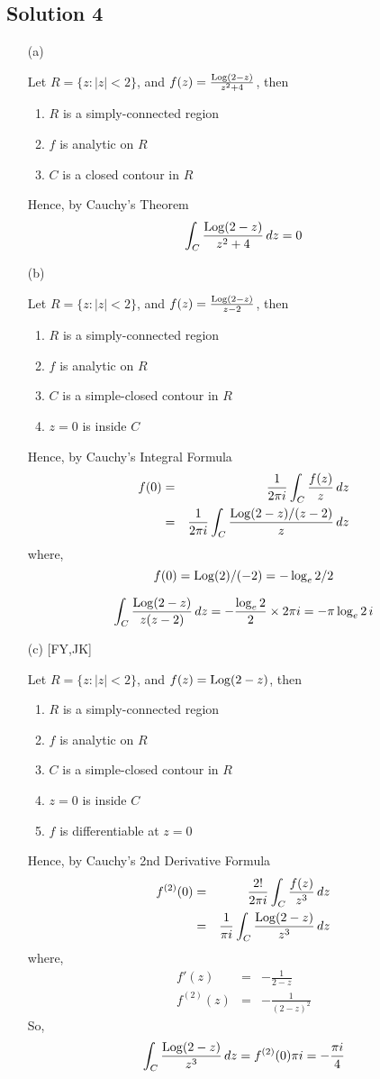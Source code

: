 \subsection*{Solution 4}

\begin{itemize}
\item[(a)]

Let $R=\{ z: |z|<2 \}$, and $f(z)=\frac{{\rm Log}(2-z)}{z^2+4}$, then
\begin{enumerate}
\item $R$ is a simply-connected region
\item $f$ is analytic on $R$
\item $C$ is a closed contour in $R$
\end{enumerate}
Hence, by Cauchy's Theorem
\[
\int_C \frac{{\rm Log}(2-z)}{z^2+4}\,dz = 0
\]

\item[(b)]

Let $R=\{ z: |z|<2 \}$, and $f(z)=\frac{{\rm Log}(2-z)}{z-2}$, then
\begin{enumerate}
\item $R$ is a simply-connected region
\item $f$ is analytic on $R$
\item $C$ is a simple-closed contour in $R$
\item $z=0$ is inside $C$
\end{enumerate}
Hence, by Cauchy's Integral Formula 
\begin{eqnarray*}
f(0)	&=& \frac{1}{2\pi i} \int_C \frac{f(z)}{z}\, dz \\
	&=& \frac{1}{2\pi i} \int_C \frac{{\rm Log}(2-z)/(z-2)}{z}\, dz \\
\end{eqnarray*}
where,
\[ f(0) = {\rm Log}(2)/(-2) = -\log_e 2/2 \]

\[
\int_C \frac{{\rm Log}(2-z)}{z(z-2)}\,dz = -\frac{\log_e 2}{2}\times2\pi i = -\pi\log_e 2\,i
\]

\item[(c)][FY,JK]

Let $R=\{ z: |z|<2 \}$, and $f(z)={\rm Log}(2-z)$, then
\begin{enumerate}
\item $R$ is a simply-connected region
\item $f$ is analytic on $R$
\item $C$ is a simple-closed contour in $R$
\item $z=0$ is inside $C$
\item $f$ is differentiable at $z=0$
\end{enumerate}
Hence, by Cauchy's 2nd Derivative Formula
\begin{eqnarray*}
f^{(2)}(0)
	&=& \frac{2!}{2\pi i} \int_C \frac{ f(z) }{ z^3 }\, dz \\
	&=& \frac{1}{\pi i} \int_C \frac{ {\rm Log}(2-z) }{ z^3 }\, dz
\end{eqnarray*}
where,
\begin{eqnarray*}
f'(z)	&=& -\frac{1}{2-z} \\
f^{(2)}(z)
	&=& -\frac{1}{(2-z)^2}
\end{eqnarray*}
So,
\[
\int_C \frac{ {\rm Log}(2-z) }{ z^3 }\,dz = f^{(2)}(0)\pi i = -\frac{\pi i}{4}
\]

\end{itemize}


